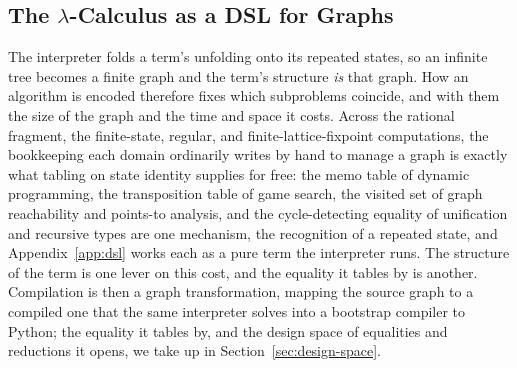 \subsection{The \texorpdfstring{$\lambda$}{lambda}-Calculus as a DSL for Graphs}\label{sec:graphs}
The interpreter folds a term's unfolding onto its repeated states, so an infinite tree becomes a finite graph and the term's structure \emph{is} that graph. How an algorithm is encoded therefore fixes which subproblems coincide, and with them the size of the graph and the time and space it costs. Across the rational fragment, the finite-state, regular, and finite-lattice-fixpoint computations, the bookkeeping each domain ordinarily writes by hand to manage a graph is exactly what tabling on state identity supplies for free: the memo table of dynamic programming, the transposition table of game search, the visited set of graph reachability and points-to analysis, and the cycle-detecting equality of unification and recursive types are one mechanism, the recognition of a repeated state, and Appendix~\ref{app:dsl} works each as a pure term the interpreter runs. The structure of the term is one lever on this cost, and the equality it tables by is another. Compilation is then a graph transformation, mapping the source graph to a compiled one that the same interpreter solves into a bootstrap compiler to Python; the equality it tables by, and the design space of equalities and reductions it opens, we take up in Section~\ref{sec:design-space}.

